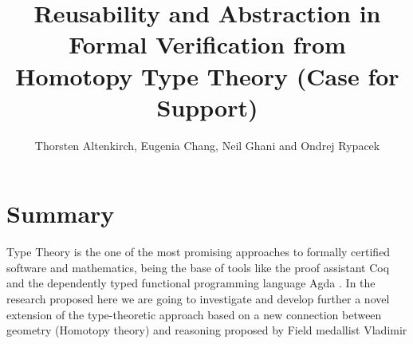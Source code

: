 \documentclass[twocolumn,a4paper,11pt]{article}
\title{Reusability and Abstraction in Formal Verification from Homotopy Type Theory
\LARGE (Case for Support)}
\author{Thorsten Altenkirch, Eugenia Chang, Neil Ghani and Ondrej Rypacek}
\date{}
\begin{document}
\raggedright
\sffamily

\maketitle
\section*{Summary}
Type Theory is the one of the most promising approaches to formally
certified software and mathematics, being the base of tools like the
proof assistant Coq \cite{CoqArt} and the dependently typed functional
programming language Agda \cite{Agda}. In the research proposed here
we are going to investigate and develop further a novel extension of
the type-theoretic approach based on a new connection between geometry
(Homotopy theory) and reasoning proposed by Field medallist Vladimir
\end{document}
